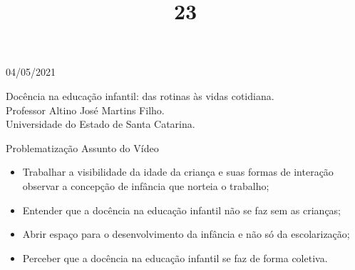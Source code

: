 \documentclass{SchoolBook}
\begin{document}
    \begin{day}{04/05/2021}
        \title{2}{
            Docência na educação infantil: das rotinas às vidas cotidiana. \\
            Professor Altino José Martins Filho. \\
            Universidade do Estado de Santa Catarina.
        }

        \title{3}{Problematização Assunto do Vídeo}

        \begin{itemize}[nosep]
            \item Trabalhar a visibilidade da idade da criança e suas formas de interação observar a concepção de infância que norteia o trabalho;

            \item Entender que a docência na educação infantil não se faz sem as crianças;

            \item Abrir espaço para o desenvolvimento da infância e não só da escolarização;
            
            \item Perceber que a docência na educação infantil se faz de forma coletiva.
        \end{itemize}
    \end{day}
\end{document}
